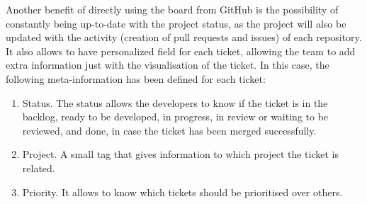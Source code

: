 \documentclass[../memory.tex]{subfiles}
\begin{document}
Another benefit of directly using the board from GitHub is the possibility of
constantly being up-to-date with the project status, as the project will also be
updated with the activity (creation of pull requests and issues) of each
repository.
\\
It also allows to have personalized field for each ticket, allowing the team to
add extra information just with the visualisation of the ticket. In this case,
the following meta-information has been defined for each ticket:
\begin{enumerate}[label = -]
	\item Status. The status allows the developers to know if the ticket is in the
	      backlog, ready to be developed, in progress, in review or waiting to be
	      reviewed, and done, in case the ticket has been merged successfully.
	\item Project. A small tag that gives information to which project the ticket
	      is related.
	\item Priority. It allows to know which tickets should be prioritised over
	      others.
\end{enumerate}
\end{document}
